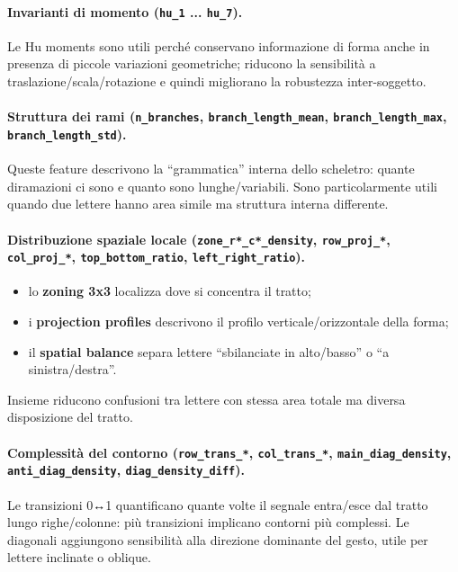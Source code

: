 \documentclass[a4paper,12pt]{article}
\begin{document}
\paragraph{Invarianti di momento (\texttt{hu\_1} ... \texttt{hu\_7}).}
Le Hu moments sono utili perché conservano informazione di forma anche in presenza di piccole variazioni geometriche; riducono la sensibilità a traslazione/scala/rotazione e quindi migliorano la robustezza inter-soggetto.

\paragraph{Struttura dei rami (\texttt{n\_branches}, \texttt{branch\_length\_mean}, \texttt{branch\_length\_max}, \texttt{branch\_length\_std}).}
Queste feature descrivono la ``grammatica'' interna dello scheletro: quante diramazioni ci sono e quanto sono lunghe/variabili. Sono particolarmente utili quando due lettere hanno area simile ma struttura interna differente.

\paragraph{Distribuzione spaziale locale (\texttt{zone\_r*\_c*\_density}, \texttt{row\_proj\_*}, \texttt{col\_proj\_*}, \texttt{top\_bottom\_ratio}, \texttt{left\_right\_ratio}).}
\begin{itemize}[leftmargin=1.5em]
  \item lo \textbf{zoning 3x3} localizza dove si concentra il tratto;
  \item i \textbf{projection profiles} descrivono il profilo verticale/orizzontale della forma;
  \item il \textbf{spatial balance} separa lettere ``sbilanciate in alto/basso'' o ``a sinistra/destra''.
\end{itemize}
Insieme riducono confusioni tra lettere con stessa area totale ma diversa disposizione del tratto.

\paragraph{Complessità del contorno (\texttt{row\_trans\_*}, \texttt{col\_trans\_*}, \texttt{main\_diag\_density}, \texttt{anti\_diag\_density}, \texttt{diag\_density\_diff}).}
Le transizioni 0↔1 quantificano quante volte il segnale entra/esce dal tratto lungo righe/colonne: più transizioni implicano contorni più complessi. Le diagonali aggiungono sensibilità alla direzione dominante del gesto, utile per lettere inclinate o oblique.
\end{document}
